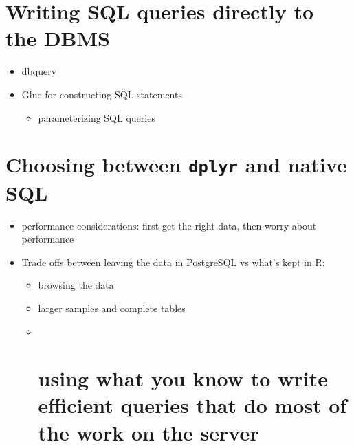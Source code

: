 \documentclass[]{book}
\providecommand{\tightlist}{%
  \setlength{\itemsep}{0pt}\setlength{\parskip}{0pt}}
\theoremstyle{definition}
\theoremstyle{definition}
\theoremstyle{definition}
\theoremstyle{remark}
\begin{document}
\hypertarget{writing-sql-queries-directly-to-the-dbms}{%
\section{Writing SQL queries directly to the
DBMS}\label{writing-sql-queries-directly-to-the-dbms}}

\begin{itemize}
\tightlist
\item
  dbquery
\item
  Glue for constructing SQL statements

  \begin{itemize}
  \tightlist
  \item
    parameterizing SQL queries
  \end{itemize}
\end{itemize}

\hypertarget{choosing-between-dplyr-and-native-sql}{%
\section{\texorpdfstring{Choosing between \texttt{dplyr} and native
SQL}{Choosing between dplyr and native SQL}}\label{choosing-between-dplyr-and-native-sql}}

\begin{itemize}
\tightlist
\item
  performance considerations: first get the right data, then worry about
  performance
\item
  Trade offs between leaving the data in PostgreSQL vs what's kept in R:

  \begin{itemize}
  \item
    browsing the data
  \item
    larger samples and complete tables
  \item ~
    \hypertarget{using-what-you-know-to-write-efficient-queries-that-do-most-of-the-work-on-the-server}{%
    \section{using what you know to write efficient queries that do most
    of the work on the
    server}\label{using-what-you-know-to-write-efficient-queries-that-do-most-of-the-work-on-the-server}}
  \end{itemize}
\end{itemize}
\end{document}
